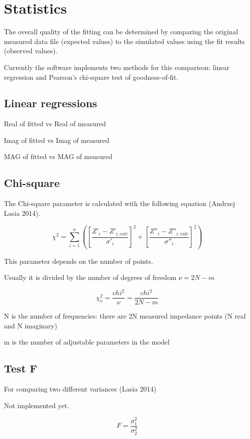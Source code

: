 \documentclass[9pt,a4paper,oneside]{book}
\begin{document}
\newpage
\section{Statistics}

The overall quality of the fitting can be determined by comparing the original measured data file (expected values) to the simulated values using the fit results (observed values).

Currently the software implements two methods for this comparison: linear regression and Pearson's chi-square test of goodness-of-fit.

\subsection{Linear regressions}

Real of fitted vs Real of measured

Imag of fitted vs Imag of measured

MAG of fitted vs MAG of measured

\subsection{Chi-square}

The Chi-square parameter is calculated with the following equation (Andrzej Lasia 2014).

\[ \chi^2 = \sum_{i=1}^{n}{\left( \left[ \dfrac{Z'_i - Z'_{i,calc}}{\sigma'_i} \right]^2 + \left[ \dfrac{Z''_i - Z''_{i,calc}}{\sigma''_i} \right]^2 \right)} \]

This parameter depends on the number of points.

Usually it is divided by the number of degrees of freedom $\nu = 2N - m$

\[ \chi^2_v = \dfrac{chi^2}{\nu} = \dfrac{chi^2}{2N - m} \]

N is the number of frequencies: there are 2N measured impedance points (N real and N imaginary)

m is the number of adjustable parameters in the model


\subsection{Test F}

For comparing two different variances (Lasia 2014)

Not implemented yet.

\[ F = \dfrac{\sigma_1^2}{\sigma_2^2} \]
\end{document}
